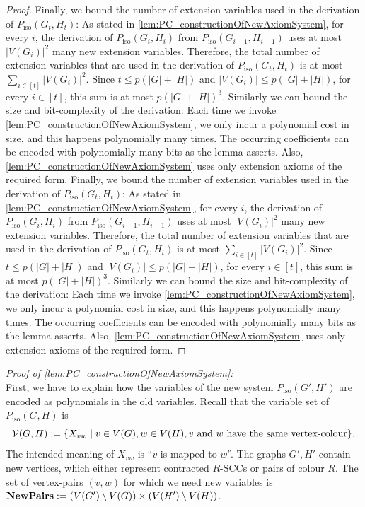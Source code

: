 \documentclass[a4paper,UKenglish,cleveref, autoref, thm-restate]{lipics-v2021}
\newcommand{\Pairs}{\text{\upshape \textbf{NewPairs}}}
\newcommand{\Vv}{{\cal V}}
\newcommand{\Piso}{P_{\text{iso}}}
\begin{document}
\begin{proof}
		Finally, we bound the number of extension variables used in the derivation of $\Piso(G_t,H_t)$: As stated in \autoref{lem:PC_constructionOfNewAxiomSystem}, for every $i$, the derivation of $\Piso(G_i,H_i)$ from $\Piso(G_{i-1}, H_{i-1})$ uses at most $|V(G_i)|^2$ many new extension variables.
		Therefore, the total number of extension variables that are used in the derivation of $\Piso(G_t,H_t)$ is at most $\sum_{i \in [t]} |V(G_i)|^2$. Since $t \leq p(|G| + |H|)$ and $|V(G_i)| \leq p(|G| + |H|)$, for every $i \in [t]$, this sum is at most $p(|G| + |H|)^3$. Similarly we can bound the size and bit-complexity of the derivation: Each time we invoke \autoref{lem:PC_constructionOfNewAxiomSystem}, we only incur a polynomial cost in size, and this happens polynomially many times. The occurring coefficients can be encoded with polynomially many bits as the lemma asserts. Also, \autoref{lem:PC_constructionOfNewAxiomSystem} uses only extension axioms of the required form.
		Finally, we bound the number of extension variables used in the derivation of $\Piso(G_t,H_t)$: As stated in \autoref{lem:PC_constructionOfNewAxiomSystem}, for every $i$, the derivation of $\Piso(G_i,H_i)$ from $\Piso(G_{i-1}, H_{i-1})$ uses at most $|V(G_i)|^2$ many new extension variables.
		Therefore, the total number of extension variables that are used in the derivation of $\Piso(G_t,H_t)$ is at most $\sum_{i \in [t]} |V(G_i)|^2$. Since $t \leq p(|G| + |H|)$ and $|V(G_i)| \leq p(|G| + |H|)$, for every $i \in [t]$, this sum is at most $p(|G| + |H|)^3$. Similarly we can bound the size and bit-complexity of the derivation: Each time we invoke \autoref{lem:PC_constructionOfNewAxiomSystem}, we only incur a polynomial cost in size, and this happens polynomially many times. The occurring coefficients can be encoded with polynomially many bits as the lemma asserts. Also, \autoref{lem:PC_constructionOfNewAxiomSystem} uses only extension axioms of the required form.
	\end{proof}
	\textit{Proof of \autoref{lem:PC_constructionOfNewAxiomSystem}:}\\
	First, we have to explain how the variables of the new system $\Piso(G',H')$ are encoded as polynomials in the old variables. 
	Recall that the variable set of $\Piso(G,H)$ is 
	\[
	\Vv(G,H) :=   \{ X_{vw} \mid v \in V(G), w \in V(H), v \text{ and } w \text{ have the same vertex-colour}  \}.
	\]
	The intended meaning of $X_{vw}$ is ``$v$ is mapped to $w$''. The graphs $G',H'$ contain new vertices, which either represent contracted $R$-SCCs or pairs of colour $R$.
	The set of vertex-pairs $(v,w)$ for which we need new variables is $\Pairs :=  (V(G') \setminus V(G)) \times (V(H') \setminus V(H))$.\\
\end{document}
